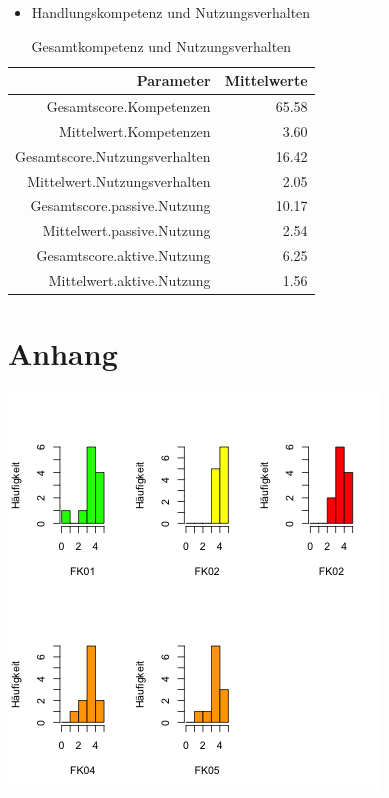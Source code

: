 \documentclass[12pt, bibliography=totoc]{scrartcl}
\begin{document}
\begin{itemize}
\tightlist
\item
  Handlungskompetenz und Nutzungsverhalten
\end{itemize}

\begin{table}[H]
\centering
\caption{Gesamtkompetenz und Nutzungsverhalten}
\begin{tabular}{rr}
  \hline
 Parameter & Mittelwerte\\
  \hline
Gesamtscore.Kompetenzen & 65.58 \\
  Mittelwert.Kompetenzen & 3.60 \\
  Gesamtscore.Nutzungsverhalten & 16.42 \\
  Mittelwert.Nutzungsverhalten & 2.05 \\
  Gesamtscore.passive.Nutzung & 10.17 \\
  Mittelwert.passive.Nutzung & 2.54 \\
  Gesamtscore.aktive.Nutzung & 6.25 \\
  Mittelwert.aktive.Nutzung & 1.56 \\
   \hline
\end{tabular}
\end{table}

\pagebreak

\pagebreak
\printbibliography
\pagebreak
\appendix


  \section{Anhang}
  \includegraphics{Anhang/schoen.png}
  
  


%
%
\end{document}
